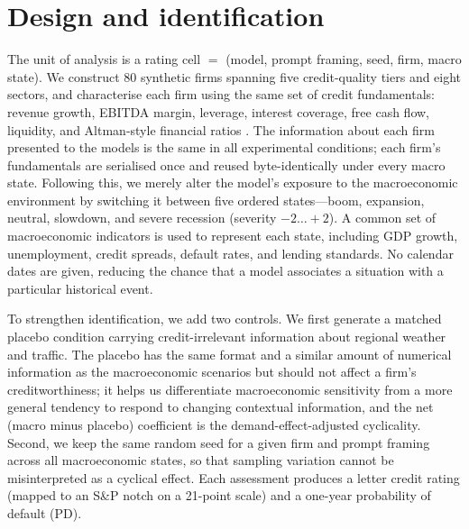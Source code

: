 \documentclass[a4paper,fleqn]{cas-sc}
\begin{document}
\section{Design and identification}\label{sec:design}
The unit of analysis is a rating cell $=$ (model, prompt framing, seed, firm, macro state). We
construct $80$ synthetic firms spanning five credit-quality tiers and eight sectors, and characterise
each firm using the same set of credit fundamentals: revenue growth, EBITDA margin, leverage, interest
coverage, free cash flow, liquidity, and Altman-style financial ratios \citep{altman1968}. The
information about each firm presented to the models is the same in all experimental conditions; each
firm's fundamentals are serialised once and reused byte-identically under every macro state. Following
this, we merely alter the model's exposure to the macroeconomic environment by switching it between
five ordered states---boom, expansion, neutral, slowdown, and severe recession (severity
$-2\ldots+2$). A common set of macroeconomic indicators is used to represent each state, including GDP
growth, unemployment, credit spreads, default rates, and lending standards. No calendar dates are
given, reducing the chance that a model associates a situation with a particular historical event.

To strengthen identification, we add two controls. We first generate a matched placebo condition
carrying credit-irrelevant information about regional weather and traffic. The placebo has the same
format and a similar amount of numerical information as the macroeconomic scenarios but should not
affect a firm's creditworthiness; it helps us differentiate macroeconomic sensitivity from a more
general tendency to respond to changing contextual information, and the net (macro minus placebo)
coefficient is the demand-effect-adjusted cyclicality. Second, we keep the same random seed for a
given firm and prompt framing across all macroeconomic states, so that sampling variation cannot be
misinterpreted as a cyclical effect. Each assessment produces a letter credit rating (mapped to an
S\&P notch on a 21-point scale) and a one-year probability of default (PD).
\end{document}
